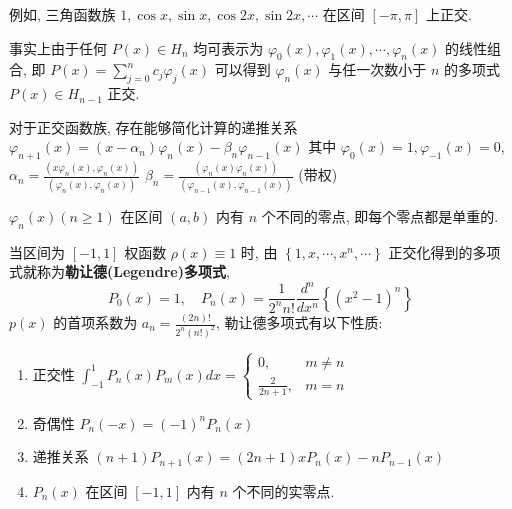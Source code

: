 \documentclass[10pt]{yerbaformat}
\begin{document}
\par 例如, 三角函数族 $1, \cos x, \sin x, \cos 2 x, \sin 2 x, \cdots$ 在区间 $[-\pi, \pi]$ 上正交.

\par 事实上由于任何 $P(x) \in H_{n}$ 均可表示为 $\varphi_{0}(x), \varphi_{1}(x), \cdots, \varphi_{n}(x)$ 的线性组合, 即 $P(x)=\sum_{j=0}^{n} c_{j} \varphi_{j}(x)$ 可以得到 $\varphi_{n}(x)$ 与任一次数小于 $n$ 的多项式 $P(x) \in H_{n-1}$ 正交.

\begin{theorem}
    对于正交函数族, 存在能够简化计算的递推关系 $\varphi_{n+1}(x)=\left(x-\alpha_{n}\right) \varphi_{n}(x)-\beta_{n} \varphi_{n-1}(x)$ 其中 $\varphi_{0}(x)=1, \varphi_{-1}(x)=0$, $\alpha_{n}=\frac{\left(x \varphi_{n}(x), \varphi_{n}(x)\right)}{\left(\varphi_{n}(x), \varphi_{n}(x)\right)}$ $\beta_{n}=\frac{\left(\varphi_{n}(x) \varphi_{n}(x)\right)}{\left(\varphi_{n-1}(x), \varphi_{n-1}(x)\right)}$ (带权)
\end{theorem}

\begin{theorem}
    $\varphi_{n}(x)(n \geq 1)$ 在区间 $(a, b)$ 内有 $n$ 个不同的零点, 即每个零点都是单重的.
\end{theorem}

\begin{definition}
    当区间为 $[-1,1]$ 权函数 $\rho(x) \equiv 1$ 时, 由 $\left\{1, x, \cdots, x^{n}, \cdots\right\}$ 正交化得到的多项式就称为\textbf{勒让德(Legendre)多项式},
    $$
        P_{0}(x)=1, \quad P_{n}(x)=\frac{1}{2^{n} n !} \frac{d^{n}}{d x^{n}}\left\{\left(x^{2}-1\right)^{n}\right\}
    $$
    $p(x)$ 的首项系数为 $a_{n}=\frac{(2 n) !}{2^{n}(n !)^{2}}$, 勒让德多项式有以下性质:
    \begin{enumerate}
        \item 正交性 $\int_{-1}^{1} P_{n}(x) P_{m}(x) d x=\left\{\begin{array}{cl}0, & m \neq n \\ \frac{2}{2 n+1}, & m=n\end{array}\right.$
        \item 奇偶性 $P_{n}(-x)=(-1)^{n} P_{n}(x)$
        \item 递推关系 $(n+1) P_{n+1}(x)=(2 n+1) x P_{n}(x)-n P_{n-1}(x)$
        \item $P_{n}(x)$ 在区间 $[-1,1]$ 内有 $n$ 个不同的实零点.
    \end{enumerate}
\end{definition}
\end{document}
